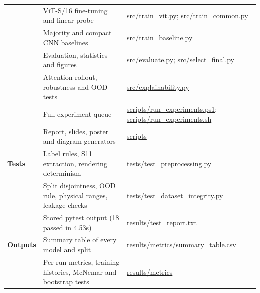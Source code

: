 \documentclass[11pt,a4paper]{article}
\begin{document}
\begin{table}[H]
\begin{tabularx}{\linewidth}{XXX}
 & ViT-S/16 fine-tuning and linear probe & \href{https://github.com/rathiabeth-sudo/901---module-1/blob/main/src/train_vit.py}{src/train\_vit.py}; \href{https://github.com/rathiabeth-sudo/901---module-1/blob/main/src/train_common.py}{src/train\_common.py} \\
 & Majority and compact CNN baselines & \href{https://github.com/rathiabeth-sudo/901---module-1/blob/main/src/train_baseline.py}{src/train\_baseline.py} \\
 & Evaluation, statistics and figures & \href{https://github.com/rathiabeth-sudo/901---module-1/blob/main/src/evaluate.py}{src/evaluate.py}; \href{https://github.com/rathiabeth-sudo/901---module-1/blob/main/src/select_final.py}{src/select\_final.py} \\
 & Attention rollout, robustness and OOD tests & \href{https://github.com/rathiabeth-sudo/901---module-1/blob/main/src/explainability.py}{src/explainability.py} \\
 & Full experiment queue & \href{https://github.com/rathiabeth-sudo/901---module-1/blob/main/scripts/run_experiments.ps1}{scripts/run\_experiments.ps1}; \href{https://github.com/rathiabeth-sudo/901---module-1/blob/main/scripts/run_experiments.sh}{scripts/run\_experiments.sh} \\
 & Report, slides, poster and diagram generators & \href{https://github.com/rathiabeth-sudo/901---module-1/tree/main/scripts}{scripts} \\
\textbf{Tests} & Label rules, S11 extraction, rendering determinism & \href{https://github.com/rathiabeth-sudo/901---module-1/blob/main/tests/test_preprocessing.py}{tests/test\_preprocessing.py} \\
 & Split disjointness, OOD rule, physical ranges, leakage checks & \href{https://github.com/rathiabeth-sudo/901---module-1/blob/main/tests/test_dataset_integrity.py}{tests/test\_dataset\_integrity.py} \\
 & Stored pytest output (18 passed in 4.53s) & \href{https://github.com/rathiabeth-sudo/901---module-1/blob/main/results/test_report.txt}{results/test\_report.txt} \\
\textbf{Outputs} & Summary table of every model and split & \href{https://github.com/rathiabeth-sudo/901---module-1/blob/main/results/metrics/summary_table.csv}{results/metrics/summary\_table.csv} \\
 & Per-run metrics, training histories, McNemar and bootstrap tests & \href{https://github.com/rathiabeth-sudo/901---module-1/tree/main/results/metrics}{results/metrics} \\

\end{tabularx}
\end{table}
\end{document}

